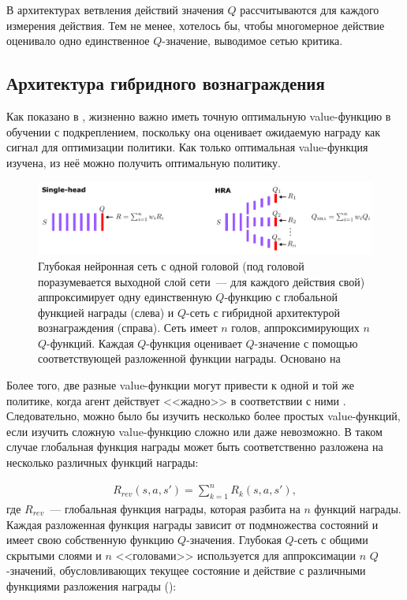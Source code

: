 В архитектурах ветвления действий значения $Q$ рассчитываются для каждого измерения действия. Тем не менее, хотелось бы, чтобы многомерное действие оценивало одно единственное $Q$-значение, выводимое сетью критика.

\subsection{Архитектура гибридного вознаграждения}

Как показано в \cite{seijen2017hybrid}, жизненно важно иметь точную оптимальную value-функцию в обучении с подкреплением, поскольку она оценивает ожидаемую награду как сигнал для оптимизации политики. Как только оптимальная value-функция изучена, из неё можно получить оптимальную политику.

\begin{figure}[ht!]
    \center
    \includegraphics [scale=0.80] {my_folder/images/ch2/hybrid-reward.png}
    \caption{Глубокая нейронная сеть с одной головой (под головой поразумевается выходной слой сети~--- для каждого действия свой) аппроксимирует одну единственную $Q$-функцию с глобальной функцией награды (слева) и $Q$-сеть с гибридной архитектурой вознаграждения (справа). Сеть имеет $n$ голов, аппроксимирующих $n$ $Q$-функций. Каждая $Q$-функция оценивает $Q$-значение с помощью соответствующей разложенной функции награды. Основано на \cite{seijen2017hybrid}}
    \label{fig:ch2-hybrid-reward}
\end{figure}

Более того, две разные value-функции могут привести к одной и той же политике, когда агент действует <<жадно>> в соответствии с ними \cite{seijen2017hybrid}. Следовательно, можно было бы изучить несколько более простых value-функций, если изучить сложную value-функцию сложно или даже невозможно. В таком случае глобальная функция награды может быть соответственно разложена на несколько различных функций награды:

\begin{equation}
    \begin{multlined}
        R_{rev}(s, a, s') = \sum^n_{k=1} R_k (s, a, s'),
    \end{multlined}
\end{equation}
где $R_{rev}$~--- глобальная функция награды, которая разбита на $n$ функций награды. Каждая разложенная функция награды зависит от подмножества состояний и имеет свою собственную функцию $Q$-значения. Глубокая $Q$-сеть с общими скрытыми слоями и $n$ <<головами>> используется для аппроксимации $n$ $Q$-значений, обусловливающих текущее состояние и действие с различными функциями разложения награды ():

